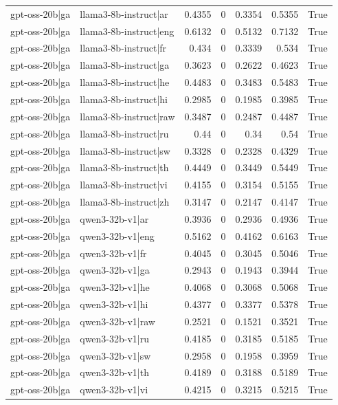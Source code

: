 \begin{table}
\begin{tabular}{l l r r r r l}
gpt-oss-20b|ga & llama3-8b-instruct|ar & 0.4355 & 0 & 0.3354 & 0.5355 & True \\
gpt-oss-20b|ga & llama3-8b-instruct|eng & 0.6132 & 0 & 0.5132 & 0.7132 & True \\
gpt-oss-20b|ga & llama3-8b-instruct|fr & 0.434 & 0 & 0.3339 & 0.534 & True \\
gpt-oss-20b|ga & llama3-8b-instruct|ga & 0.3623 & 0 & 0.2622 & 0.4623 & True \\
gpt-oss-20b|ga & llama3-8b-instruct|he & 0.4483 & 0 & 0.3483 & 0.5483 & True \\
gpt-oss-20b|ga & llama3-8b-instruct|hi & 0.2985 & 0 & 0.1985 & 0.3985 & True \\
gpt-oss-20b|ga & llama3-8b-instruct|raw & 0.3487 & 0 & 0.2487 & 0.4487 & True \\
gpt-oss-20b|ga & llama3-8b-instruct|ru & 0.44 & 0 & 0.34 & 0.54 & True \\
gpt-oss-20b|ga & llama3-8b-instruct|sw & 0.3328 & 0 & 0.2328 & 0.4329 & True \\
gpt-oss-20b|ga & llama3-8b-instruct|th & 0.4449 & 0 & 0.3449 & 0.5449 & True \\
gpt-oss-20b|ga & llama3-8b-instruct|vi & 0.4155 & 0 & 0.3154 & 0.5155 & True \\
gpt-oss-20b|ga & llama3-8b-instruct|zh & 0.3147 & 0 & 0.2147 & 0.4147 & True \\
gpt-oss-20b|ga & qwen3-32b-v1|ar & 0.3936 & 0 & 0.2936 & 0.4936 & True \\
gpt-oss-20b|ga & qwen3-32b-v1|eng & 0.5162 & 0 & 0.4162 & 0.6163 & True \\
gpt-oss-20b|ga & qwen3-32b-v1|fr & 0.4045 & 0 & 0.3045 & 0.5046 & True \\
gpt-oss-20b|ga & qwen3-32b-v1|ga & 0.2943 & 0 & 0.1943 & 0.3944 & True \\
gpt-oss-20b|ga & qwen3-32b-v1|he & 0.4068 & 0 & 0.3068 & 0.5068 & True \\
gpt-oss-20b|ga & qwen3-32b-v1|hi & 0.4377 & 0 & 0.3377 & 0.5378 & True \\
gpt-oss-20b|ga & qwen3-32b-v1|raw & 0.2521 & 0 & 0.1521 & 0.3521 & True \\
gpt-oss-20b|ga & qwen3-32b-v1|ru & 0.4185 & 0 & 0.3185 & 0.5185 & True \\
gpt-oss-20b|ga & qwen3-32b-v1|sw & 0.2958 & 0 & 0.1958 & 0.3959 & True \\
gpt-oss-20b|ga & qwen3-32b-v1|th & 0.4189 & 0 & 0.3188 & 0.5189 & True \\
gpt-oss-20b|ga & qwen3-32b-v1|vi & 0.4215 & 0 & 0.3215 & 0.5215 & True \\

\end{tabular}
\end{table}
